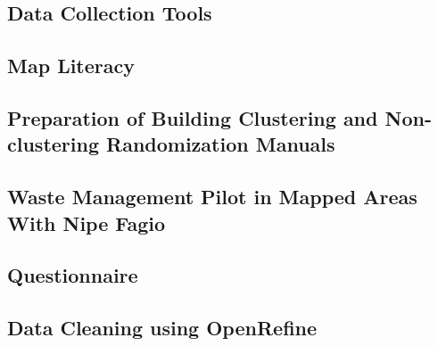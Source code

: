 \documentclass[a4paper,12pt,twoside]{article}
\begin{document}
    \begin{multicols}{2}
    \lipsum[0-5]
    \end{multicols}
	
\subsection{Data Collection Tools}

    \begin{multicols}{2}
    \lipsum[0-5]
    \end{multicols}

\subsection{Map Literacy}

    \begin{multicols}{2}
    \lipsum[0-5]
    \end{multicols}

\subsection{Preparation of Building Clustering and Non-clustering Randomization Manuals}

    \begin{multicols}{2}
    \lipsum[0-5]
    \end{multicols}

\subsection{Waste Management Pilot in Mapped Areas With Nipe Fagio}

    \begin{multicols}{2}
    \lipsum[0-5]
    \end{multicols}

\subsection{Questionnaire}

    \begin{multicols}{2}
    \lipsum[0-5]
    \end{multicols}

\subsection{Data Cleaning using OpenRefine}

    \begin{multicols}{2}
    \lipsum[0-5]
    \end{multicols}
\end{document}
